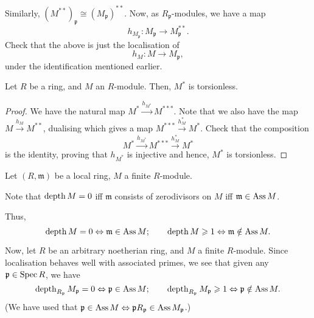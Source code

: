 \documentclass[12pt]{article}
\begin{document}
Similarly, $(M^{\ast \ast})_{\mathfrak{p}} \cong (M_{\mathfrak{p}})^{\ast \ast}$. Now, as $R_{\mathfrak{p}}$-modules, we have a map
\begin{equation*} 
	h_{M_{\mathfrak{p}}} : M_{\mathfrak{p}} \to M_{\mathfrak{p}}^{\ast \ast}.
\end{equation*}
Check that the above is just the localisation of
\begin{equation*} 
	h_{M} : M \to M_{\mathfrak{p}},
\end{equation*}
under the identification mentioned earlier.

\begin{prop}
	Let $R$ be a ring, and $M$ an $R$-module. Then, $M^{\ast}$ is torsionless.
\end{prop}
\begin{proof} 
	We have the natural map $M^{\ast} \xrightarrow{h_{M^{\ast}}} M^{\ast \ast \ast}$. Note that we also have the map $M \xrightarrow{h_{M}} M^{\ast \ast}$, dualising which gives a map $M^{\ast \ast \ast} \xrightarrow{h_{M}^{\ast}} M^{\ast}$. Check that the composition
	\begin{equation*} 
		M^{\ast} \xrightarrow{h_{M^{\ast}}} M^{\ast \ast \ast} \xrightarrow{h_{M}^{\ast}} M^{\ast}
	\end{equation*}
	is the identity, proving that $h_{M^{\ast}}$ is injective and hence, $M^{\ast}$ is torsionless.
\end{proof}

\begin{obs} \label{obs:depth-and-ass}
	Let $(R, \mathfrak{m})$ be a local ring, $M$ a finite $R$-module. 

	Note that $\operatorname{depth} M = 0$ iff $\mathfrak{m}$ consists of zerodivisors on $M$ iff $\mathfrak{m} \in \operatorname{Ass} M$. 

	Thus,
	\begin{equation*} 
		\operatorname{depth} M = 0 \Leftrightarrow \mathfrak{m} \in \operatorname{Ass} M; \qquad \operatorname{depth} M \geqslant 1 \Leftrightarrow \mathfrak{m} \notin \operatorname{Ass} M.
	\end{equation*}

	Now, let $R$ be an arbitrary noetherian ring, and $M$ a finite $R$-module. Since localisation behaves well with associated primes, we see that given any $\mathfrak{p} \in \operatorname{Spec} R$, we have
	\begin{equation*} 
		\operatorname{depth}_{R_{\mathfrak{p}}} M_{\mathfrak{p}} = 0 \Leftrightarrow \mathfrak{p} \in \operatorname{Ass} M; \qquad \operatorname{depth}_{R_{\mathfrak{p}}} M_{\mathfrak{p}} \geqslant 1 \Leftrightarrow \mathfrak{p} \notin \operatorname{Ass} M.
	\end{equation*}
	(We have used that $\mathfrak{p} \in \operatorname{Ass} M \Leftrightarrow \mathfrak{p} R_{\mathfrak{p}} \in \operatorname{Ass} M_{\mathfrak{p}}$.)
\end{obs}
\end{document}
